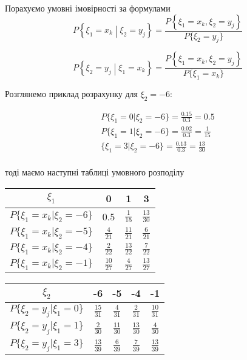 \documentclass{article}
\begin{document}
	Порахуємо умовні імовірності за формулами 
	\[
	P\left\{ \xi_1=x_k \middle\vert \xi_2=y_j \right\} = \frac{P\left\{ \xi_1=x_k, \xi_2=y_j \right\}}{P\{\xi_2=y_j\}}
	\]
	
	\[
		P\left\{ \xi_2=y_j \middle\vert \xi_1=x_k \right\} =\frac{P\left\{ \xi_1=x_k, \xi_2=y_j \right\}}{P\{\xi_1=x_k\}}
	\]
	
	Розглянемо приклад розрахунку для $\xi_2 = -6$:
	
	\[
		\begin{gathered}
		P\{\xi_1=0\vert\xi_2=-6\} = \frac{0.15}{0.3} = 0.5 \\
		P\{\xi_1=1\vert\xi_2=-6\} = \frac{0.02}{0.3} = \frac{1}{15} \\
		\{\xi_1=3\vert\xi_2=-6\} = \frac{0.13}{0.3} = \frac{13}{30} \\
		\end{gathered}	
	\]
	
	тоді маємо наступні таблиці умовного розподілу
	\begin{center}
	\begin{tabular}{|c|c|c|c|}
	\hline
	$\xi_1$ & 0 & 1 & 3 \\ \hline
	$P\{\xi_1 = x_k \vert \xi_2=-6 \}$ & 0.5 & $\frac{1}{15}$ & $\frac{13}{30}$ \\ \hline
	$P\{\xi_1 = x_k \vert \xi_2=-5 \}$ & $\frac{4}{21}$ & $\frac{11}{21}$ & $\frac{6}{21}$ \\ \hline
	$P\{\xi_1 = x_k \vert \xi_2=-4 \}$ & $\frac{2}{22}$ & $\frac{13}{22}$ & $\frac{7}{22}$ \\ \hline
	$P\{\xi_1 = x_k \vert \xi_2=-1 \}$ & $\frac{10}{27}$ & $\frac{4}{27}$ & $\frac{13}{27}$ \\ \hline
	\end{tabular}
	\end{center}
	\begin{center}
	\begin{tabular}{|c|c|c|c|c|}
	\hline
	$\xi_2$ & -6 & -5 & -4 & -1 \\ \hline
	$P\{ \xi_2 = y_j \vert \xi_1=0 \}$ & $\frac{15}{31}$ & $\frac{4}{31}$ & $\frac{2}{31}$ & $\frac{10}{31}$ \\ \hline
	$P\{ \xi_2 = y_j \vert \xi_1=1 \}$ & $\frac{2}{30}$ & $\frac{11}{30}$ & $\frac{13}{30}$ & $\frac{4}{30}$ \\ \hline
	$P\{ \xi_2 = y_j \vert \xi_1=3 \}$ & $\frac{13}{39}$ & $\frac{6}{39}$ & $\frac{7}{39}$ & $\frac{13}{39}$ \\ \hline
	\end{tabular}
	\end{center}
\end{document}
